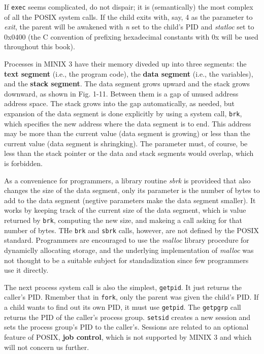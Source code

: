 \documentclass{book}
\newcommand {\kw}  [1] {\textbf{#1}}
\newcommand {\sys} [1] {\textsl{#1}}
\newcommand {\cmd} [1] {\texttt{#1}}
\begin{document}
If \cmd{exec} seems complicated, do not dispair; it is (semantically) the most complex of all the POSIX system calls.
If the child exits with, say, 4 as the parameter to \sys{exit}, the parent will be awakened with \sys{n} set to the child's PID 
and \sys{statloc} set to 0x0400 (the C convention of prefixing hexadecimal constants with 0x will be used throughout this book).

Processes in MINIX 3 have their memory diveded up into three segments: the \kw{text segment} (i.e., the program code),
the \kw{data segment} (i.e., the variables), and the \kw{stack segment}.
The data segment grows upward and the stack grows downward, as shown in Fig. 1-11.
Between them is a gap of unused address address space.
The stack grows into the gap automatically, as needed, but expansion of the data segment is done explicitly by using a system call, 
\cmd{brk}, which specifies the new address where the data segment is to end.
This address may be more than the current value (data segment is growing) or less than the current value (data segment is shringking).
The parameter must, of course, be less than the stack pointer or the data and stack segments would overlap, which is forbidden.

As a convenience for programmers, a library routine \sys{sbrk} is provideed that also changes the size of the data segment, 
only its parameter is the number of bytes to add to the data segment (negtive parameters make the data segment smaller).
It works by keeping track of the current size of the data segment, which is value returned by \cmd{brk}, 
computing the new size, and makeing a call asking for that number of bytes. 
THe \cmd{brk} and \cmd{sbrk} calls, however, are not defined by the POSIX standard.
Programmers are encouraged to use the \sys{malloc} library procedure for dynamiclly allocating storage, 
and the underlying implementation of \sys{malloc} was not thought to be a suitable subject for standadization 
since few programmers use it directly.

The next process system call is also the simplest, \cmd{getpid}.
It just returns the caller's PID.
Rmember that in \cmd{fork}, only the parent was given the child's PID.
If a child wants to find out its own PID, it must use \cmd{getpid}.
The \cmd{getpgrp} call returns the PID of the caller's process group.
\cmd{setsid} creates a new session and sets the process group's PID to the caller's.
Sessions are related to an optional feature of POSIX, \kw{job control}, which is not supported by MINIX 3 and which will not concern us further.
\end{document}
